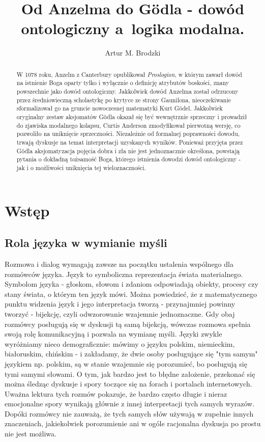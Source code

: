 \documentclass{article}
\title{Od Anzelma do Gödla - dowód ontologiczny a logika modalna.}
\author{Artur M. Brodzki}
\begin{document}
\maketitle

\begin{abstract}
	W 1078 roku, Anzelm z Canterbury opublikował \emph{Proslogion}, w którym zawarł dowód na istnienie Boga oparty tylko i wyłącznie o definicję atrybutów boskości, znany powszechnie jako dowód ontologiczny. Jakkolwiek dowód Anzelma został odrzucony przez średniowieczną scholastykę po krytyce ze strony Gaunilona, nieoczekiwanie sformalizował go na gruncie nowoczesnej matematyki  Kurt Gödel. Jakkolwiek oryginalny zestaw aksjomatów Gödla okazał się być wewnętrznie sprzeczny i prowadził do zjawiska modalnego kolapsu, Curtis Anderson zmodyfikował pierwotną wersję, co pozwoliło na uniknięcie sprzeczności. Niezależnie od formalnej poprawności dowodu, trwają dyskusje na temat interpretacji uzyskanych wyników. Ponieważ przyjęta przez Gödla aksjomatyzacja pojęcia dobra i zła nie jest jednoznacznie określona, powstają pytania o dokładną tożsamość Boga, którego istnienia dowodzi dowód ontologiczny - jak i o możliwości uniknięcia tej wieloznaczności. 
\end{abstract}

\section{Wstęp} \label{sec:intro}

\subsection{Rola języka w wymianie myśli} \label{sec:language}

Rozmowa i dialog wymagają zawsze na początku ustalenia wspólnego dla rozmówców języka. Język to symboliczna reprezentacja świata materialnego. Symbolom języka - głoskom, słowom i zdaniom odpowiadają obiekty, procesy czy stany świata, o którym ten język mówi. Można powiedzieć, że z matematycznego punktu widzenia język i jego interpretacja tworzą - przynajmniej powinny tworzyć - bijekcję, czyli odwzorowanie wzajemnie jednoznaczne. Gdy obaj rozmówcy posługują się w dyskusji tą samą bijekcją, wówczas rozmowa spełnia swoją rolę komunikacyjną i pozwala na wymianę myśli. Języki zwykle wyróżniamy nieco demograficznie: mówimy o języku polskim, niemieckim, białoruskim, chińskim - i zakładamy, że dwie osoby posługujące się "tym samym" językiem np. polskim, są w stanie wzajemnie się porozumieć, bo posługują się tymi samymi słowami. O tym, jak bardzo jest to błędne założenie, przekonać się można śledząc dyskusje i spory toczące się na forach i portalach internetowych. Uważna lektura tych rozmów pokazuje, że bardzo często długie i nieraz emocjonalne spory wynikają głównie z innej interpretacji tych samych wyrazów. Dopóki rozmówcy nie zauważą, że tych samych słów używają w zupełnie innych znaczeniach, jakiekolwiek porozumienie ani w ogóle racjonalna dyskusja po prostu nie jest możliwa. 
\end{document}
